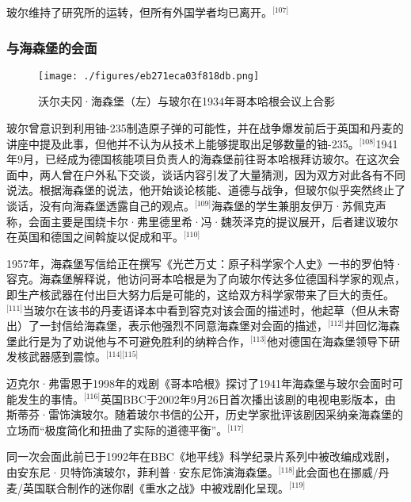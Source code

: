 玻尔维持了研究所的运转，但所有外国学者均已离开。\(^\text{[107]}\)
\subsubsection{与海森堡的会面}
\begin{figure}[ht]
\centering
\texttt{[image: ./figures/eb271eca03f818db.png]}
\caption{沃尔夫冈·海森堡（左）与玻尔在1934年哥本哈根会议上合影} \label{fig_NRSbr_9}
\end{figure}
玻尔曾意识到利用铀-235制造原子弹的可能性，并在战争爆发前后于英国和丹麦的讲座中提及此事，但他并不认为从技术上能够提取出足够数量的铀-235。\(^\text{[108]}\)1941年9月，已经成为德国核能项目负责人的海森堡前往哥本哈根拜访玻尔。在这次会面中，两人曾在户外私下交谈，谈话内容引发了大量猜测，因为双方对此各有不同说法。根据海森堡的说法，他开始谈论核能、道德与战争，但玻尔似乎突然终止了谈话，没有向海森堡透露自己的观点。\(^\text{[109]}\)海森堡的学生兼朋友伊万·苏佩克声称，会面主要是围绕卡尔·弗里德里希·冯·魏茨泽克的提议展开，后者建议玻尔在英国和德国之间斡旋以促成和平。\(^\text{[110]}\)

1957年，海森堡写信给正在撰写《光芒万丈：原子科学家个人史》一书的罗伯特·容克。海森堡解释说，他访问哥本哈根是为了向玻尔传达多位德国科学家的观点，即生产核武器在付出巨大努力后是可能的，这给双方科学家带来了巨大的责任。\(^\text{[111]}\)当玻尔在该书的丹麦语译本中看到容克对该会面的描述时，他起草（但从未寄出）了一封信给海森堡，表示他强烈不同意海森堡对会面的描述，\(^\text{[112]}\)并回忆海森堡此行是为了劝说他与不可避免胜利的纳粹合作，\(^\text{[113]}\)他对德国在海森堡领导下研发核武器感到震惊。\(^\text{[114][115]}\)

迈克尔·弗雷恩于1998年的戏剧《哥本哈根》探讨了1941年海森堡与玻尔会面时可能发生的事情。\(^\text{[116]}\)英国BBC于2002年9月26日首次播出该剧的电视电影版本，由斯蒂芬·雷饰演玻尔。随着玻尔书信的公开，历史学家批评该剧因采纳亲海森堡的立场而“极度简化和扭曲了实际的道德平衡”。\(^\text{[117]}\)

同一次会面此前已于1992年在BBC《地平线》科学纪录片系列中被改编成戏剧，由安东尼·贝特饰演玻尔，菲利普·安东尼饰演海森堡。\(^\text{[118]}\)此会面也在挪威/丹麦/英国联合制作的迷你剧《重水之战》中被戏剧化呈现。\(^\text{[119]}\)
